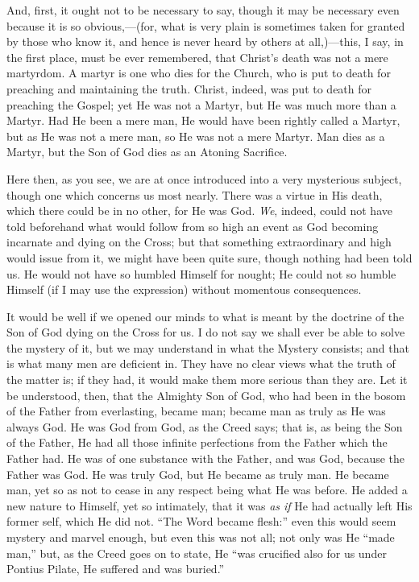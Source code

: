 And, first, it ought not to be necessary to say, though it may be
necessary even because it is so obvious,—(for, what is very plain is
sometimes taken for granted by those who know it, and hence is never
heard by others at all,)—this, I say, in the first place, must be ever
remembered, that Christ's death was not a mere martyrdom. A martyr is
one who dies for the Church, who is put to death for preaching and
maintaining the truth. Christ, indeed, was put to death for preaching
the Gospel; yet He was not a Martyr, but He was much more than a Martyr.
Had He been a mere man, He would have been rightly called a Martyr, but
as He was not a mere man, so He was not a mere Martyr. Man dies as a
Martyr, but the Son of God dies as an Atoning Sacrifice.

Here then, as you see, we are at once introduced into a very
mysterious subject, though one which concerns us most nearly. There was
a virtue in His death, which there could be in no other, for He was God.
\emph{We}, indeed, could not have told beforehand what would follow from
so high an event as God becoming incarnate and dying on the Cross; but
that something extraordinary and high would issue from it, we might have
been quite sure, though nothing had been told us. He would not have so
humbled Himself for nought; He could not so humble Himself (if I may use
the expression) without momentous consequences.

It would be well if we opened our minds to what is meant by the
doctrine of the Son of God dying on the Cross for us. I do not say we
shall ever be able to solve the mystery of it, but we may understand in
what the Mystery consists; and that is what many men are deficient in.
They have no clear views what the truth of the matter is; if they had,
it would make them more serious than they are. Let it be understood,
then, that the Almighty Son of God, who had been in the bosom of the
Father from everlasting, became man; became man as truly as He was
always God. He was God from God, as the Creed says; that is, as being
the Son of the Father, He had all those infinite perfections from the
Father which the Father had. He was of one substance with the Father,
and was God, because the Father was God. He was truly God, but He became
as truly man. He became man, yet so as not to cease in any respect being
what He was before. He added a new nature to Himself, yet so intimately,
that it was \emph{as if} He had actually left His former self, which He
did not. ``The Word became flesh:'' even this would seem mystery
and marvel enough, but even this was not all; not only was He ``made
man,'' but, as the Creed goes on to state, He ``was crucified
also for us under Pontius Pilate, He suffered and was buried.''

